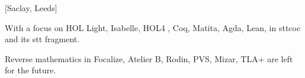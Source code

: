 [Saclay, Leeds]

With a focus on HOL Light, Isabelle, HOL4 , Coq,
Matita, Agda, Lean, in sttcoc and its stt fragment.

Reverse mathematics in Focalize, Atelier B, Rodin, PVS, Mizar, TLA+
are left for the future.

